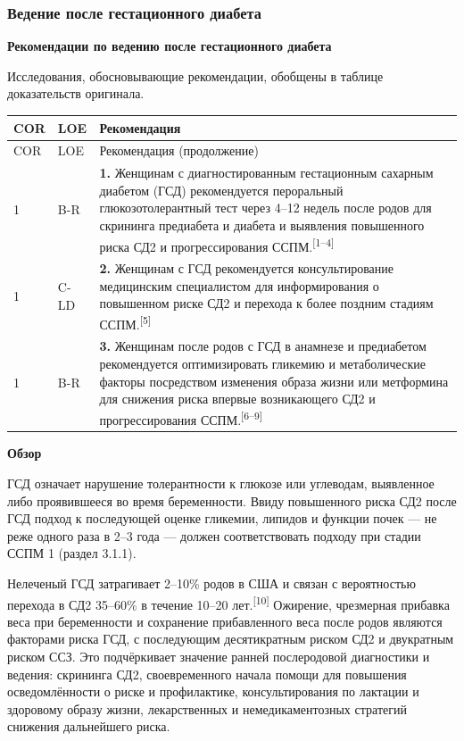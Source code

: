 \documentclass[11pt,a4paper]{article}
\newcommand{\src}[1]{\textsuperscript{[#1]}}
\newcommand{\heading}[1]{\par\medskip\textbf{#1}\par}
\begin{document}
\subsubsection{Ведение после гестационного диабета}
\heading{Рекомендации по ведению после гестационного диабета}
Исследования, обосновывающие рекомендации, обобщены в таблице доказательств оригинала.
{\small
\begin{longtable}{P{0.07\textwidth}P{0.11\textwidth}P{0.75\textwidth}}
\toprule COR & LOE & Рекомендация\\\midrule
\endfirsthead
\toprule COR & LOE & Рекомендация (продолжение)\\\midrule
{} & B-R & \textbf{1.} Женщинам с диагностированным гестационным сахарным диабетом (ГСД) рекомендуется пероральный глюкозотолерантный тест через 4--12 недель после родов для скрининга предиабета и диабета и выявления повышенного риска СД2 и прогрессирования ССПМ.\src{1--4}\\[5pt]
1 & C-LD & \textbf{2.} Женщинам с ГСД рекомендуется консультирование медицинским специалистом для информирования о повышенном риске СД2 и перехода к более поздним стадиям ССПМ.\src{5}\\[5pt]
1 & B-R & \textbf{3.} Женщинам после родов с ГСД в анамнезе и предиабетом рекомендуется оптимизировать гликемию и метаболические факторы посредством изменения образа жизни или метформина для снижения риска впервые возникающего СД2 и прогрессирования ССПМ.\src{6--9}\\
\bottomrule
\end{longtable}
}

\heading{Обзор}
ГСД означает нарушение толерантности к глюкозе или углеводам, выявленное либо проявившееся во время беременности. Ввиду повышенного риска СД2 после ГСД подход к последующей оценке гликемии, липидов и функции почек --- не реже одного раза в 2--3 года --- должен соответствовать подходу при стадии ССПМ 1 (раздел 3.1.1).

Нелеченый ГСД затрагивает 2--10\% родов в США и связан с вероятностью перехода в СД2 35--60\% в течение 10--20 лет.\src{10} Ожирение, чрезмерная прибавка веса при беременности и сохранение прибавленного веса после родов являются факторами риска ГСД, с последующим десятикратным риском СД2 и двукратным риском ССЗ. Это подчёркивает значение ранней послеродовой диагностики и ведения: скрининга СД2, своевременного начала помощи для повышения осведомлённости о риске и профилактике, консультирования по лактации и здоровому образу жизни, лекарственных и немедикаментозных стратегий снижения дальнейшего риска.
\end{document}
